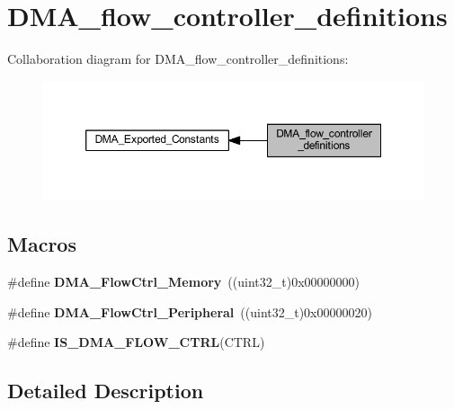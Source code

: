 \hypertarget{group___d_m_a__flow__controller__definitions}{}\section{D\+M\+A\+\_\+flow\+\_\+controller\+\_\+definitions}
\label{group___d_m_a__flow__controller__definitions}
Collaboration diagram for D\+M\+A\+\_\+flow\+\_\+controller\+\_\+definitions\+:\nopagebreak
\begin{figure}[H]
\begin{center}
\leavevmode
\includegraphics[width=350pt]{group___d_m_a__flow__controller__definitions}
\end{center}
\end{figure}
\subsection*{Macros}
\begin{DoxyCompactItemize}
\item 
\mbox{\label{group___d_m_a__flow__controller__definitions_gafe69109789c2c285f98193f4b598cbc1}} 
\#define {\bfseries D\+M\+A\+\_\+\+Flow\+Ctrl\+\_\+\+Memory}~((uint32\+\_\+t)0x00000000)
\item 
\mbox{\label{group___d_m_a__flow__controller__definitions_ga33a735d51a2b790a25c579753edddd46}} 
\#define {\bfseries D\+M\+A\+\_\+\+Flow\+Ctrl\+\_\+\+Peripheral}~((uint32\+\_\+t)0x00000020)
\item 
\#define {\bfseries I\+S\+\_\+\+D\+M\+A\+\_\+\+F\+L\+O\+W\+\_\+\+C\+T\+RL}(C\+T\+RL)
\end{DoxyCompactItemize}


\subsection{Detailed Description}


